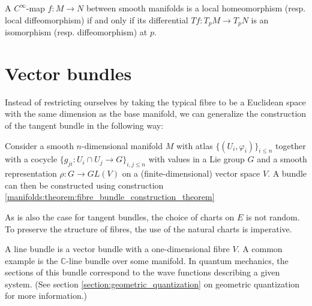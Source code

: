     \begin{theorem}\label{manifolds:theorem:inverse_function_theorem}
        A $C^\infty$-map $f:M\rightarrow N$ between smooth manifolds is a local homeomorphism (resp. local diffeomorphism) if and only if its differential $Tf:T_pM\rightarrow T_pN$ is an isomorphism (resp. diffeomorphism) at $p$.
    \end{theorem}


\section{Vector bundles}

    Instead of restricting ourselves by taking the typical fibre to be a Euclidean space with the same dimension as the base manifold, we can generalize the construction of the tangent bundle in the following way:
    \begin{construct}\label{manifolds:vector_bundle_construction}
        Consider a smooth $n$-dimensional manifold $M$ with atlas $\{(U_i, \varphi_i)\}_{i\leq n}$ together with a cocycle $\{g_{ji}: U_i\cap U_j\rightarrow G\}_{i,j\leq n}$ with values in a Lie group $G$ and a smooth representation $\rho:G\rightarrow GL(V)$ on a (finite-dimensional) vector space $V$. A bundle can then be constructed using construction \ref{manifolds:theorem:fibre_bundle_construction_theorem}
    \end{construct}

    \begin{remark}
        As is also the case for tangent bundles, the choice of charts on $E$ is not random. To preserve the structure of fibres, the use of the natural charts is imperative.
    \end{remark}

    \begin{example}
        A line bundle is a vector bundle with a one-dimensional fibre $V$. A common example is the $\mathbb{C}$-line bundle over some manifold. In quantum mechanics, the sections of this bundle correspond to the wave functions describing a given system. (See section \ref{section:geometric_quantization} on geometric quantization for more information.)
    \end{example}

